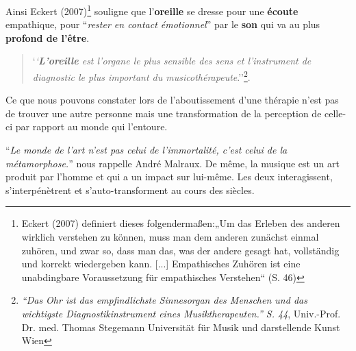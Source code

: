  

 Ainsi Eckert (2007)\autocite{seminar_zuerich}\footnote{Eckert (2007) definiert dieses folgendermaßen:„Um das Erleben des anderen wirklich verstehen zu können, muss man dem anderen zunächst einmal zuhören, und zwar so, dass man das, was der andere gesagt hat, vollständig und korrekt wiedergeben kann. [...] Empathisches Zuhören ist eine unabdingbare Voraussetzung für empathisches Verstehen“ (S. 46)} souligne que l'\textbf{oreille }se dresse pour une\textbf{ écoute} empathique, pour ``\textit{rester en contact émotionnel}'' par le \textbf{son} qui va au plus \textbf{profond de
   l'être}.
\begin{quotation}
	`\textit{`\textbf{L'oreille }est l'organe le plus sensible des sens 
et l'instrument de diagnostic  le plus important du
musicothérapeute}.''\footnote{ \textit{``Das Ohr ist das empfindlichste
  Sinnesorgan des Menschen und das wichtigste Diagnostikinstrument
  eines Musiktherapeuten.'' S. 44}, Univ.-Prof. Dr. med. Thomas Stegemann Universität für Musik und darstellende Kunst Wien}.
 \end{quotation}	
Ce que nous pouvons constater lors de l'aboutissement
d'une thérapie n'est pas de trouver une autre personne mais une transformation
de la perception de celle-ci par rapport au monde qui l'entoure.

 \enquote{\emph{Le monde de
	l'art n'est pas celui de l'immortalité, c'est celui de la métamorphose.}}
nous rappelle André Malraux. De même, la musique est un art produit par l'homme et qui a un impact
sur lui-même. Les deux interagissent, s'interpénètrent et s'auto-transforment
au cours des siècles.







 



